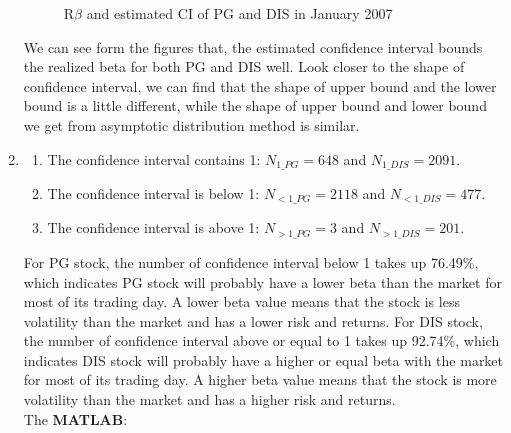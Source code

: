 \documentclass[12pt,letterpaper]{article}
\begin{document}
\begin{enumerate}[label=\textbf{(\Alph*)}]
\begin{figure}[H]
            \centering
            \caption{R$\beta$ and estimated CI of PG and DIS in January 2007}
\end{figure}

We can see form the figures that, the estimated confidence interval bounds the realized beta for both PG and DIS well. Look closer to the shape of confidence interval, we can find that the shape of upper bound and the lower bound is a little different, while the shape of upper bound and lower bound we get from asymptotic distribution method is similar. \\
  
\item 
\begin{enumerate}[label=(\roman*)]
    \item The confidence interval contains 1: $N_{1\_PG}=648$ and $N_{1\_DIS}=2091$.
    \item The confidence interval is below 1: $N_{<1\_PG}=2118$ and $N_{<1\_DIS}=477$.
    \item The confidence interval is above 1: $N_{>1\_PG}=3$ and $N_{>1\_DIS}=201$.\\
    
\end{enumerate}

For PG stock, the number of confidence interval below 1 takes up 76.49\%, which indicates PG stock will probably have a lower beta than the market for most of its trading day. A lower beta value means that the stock is less volatility than the market and has a lower risk and returns. 
For DIS stock, the number of confidence interval above or equal to 1 takes up 92.74\%, which indicates DIS stock will probably have a higher or equal beta with the market for most of its trading day. A higher beta value means that the stock is more volatility than the market and has a higher risk and returns. \\

The \textbf{MATLAB}:
   
\end{enumerate}
\newpage
\end{document}
